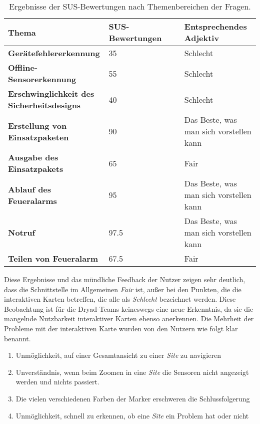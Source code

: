 \begin{table}[H]
  \begin{tabular}{p{0.4\linewidth} |p{0.3\linewidth}|p{0.3\linewidth}}
    Thema                                             & \ac{SUS}-Bewertungen & Entsprechendes Adjektiv                 \\ \hline\hline

    \textbf{Gerätefehlererkennung}                    & 35                   & Schlecht                                \\\hline
    \textbf{Offline-Sensorerkennung}                  & 55                   & Schlecht                                \\\hline
    \textbf{Erschwinglichkeit des Sicherheitsdesigns} & 40                   & Schlecht                                \\\hline
    \textbf{Erstellung von Einsatzpaketen}            & 90                   & Das Beste, was man sich vorstellen kann \\\hline
    \textbf{Ausgabe des Einsatzpakets}                & 65                   & Fair                                    \\\hline
    \textbf{Ablauf des Feueralarms}                   & 95                   & Das Beste, was man sich vorstellen kann \\\hline
    \textbf{Notruf}                                   & 97.5                 & Das Beste, was man sich vorstellen kann \\\hline
    \textbf{Teilen von Feueralarm}                    & 67.5                 & Fair
  \end{tabular}
  \caption{Ergebnisse der SUS-Bewertungen nach Themenbereichen der Fragen.}
\end{table}

Diese Ergebnisse und das mündliche Feedback der Nutzer zeigen sehr deutlich, dass die Schnittstelle im Allgemeinen \textit{Fair} ist, außer bei den Punkten, die die interaktiven Karten betreffen, die alle als \textit{Schlecht} bezeichnet werden.
Diese Beobachtung ist für die Dryad-Teams keineswegs eine neue Erkenntnis, da sie die mangelnde Nutzbarkeit interaktiver Karten ebenso anerkennen.
Die Mehrheit der Probleme mit der interaktiven Karte wurden von den Nutzern wie folgt klar benannt.

\begin{enumerate}
  \item Unmöglichkeit, auf einer Gesamtansicht zu einer \textit{Site} zu navigieren
  \item Unverständnis, wenn beim Zoomen in eine \textit{Site} die Sensoren nicht angezeigt werden und nichts passiert.
  \item Die vielen verschiedenen Farben der Marker erschweren die Schlussfolgerung
  \item Unmöglichkeit, schnell zu erkennen, ob eine \textit{Site} ein Problem hat oder nicht
\end{enumerate}

